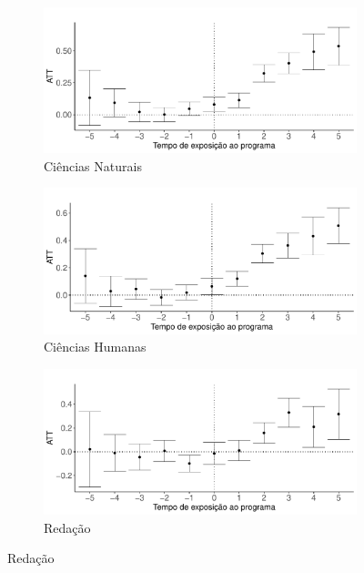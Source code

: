 \begin{figure}[H]
\begin{subfigure}{.5\textwidth}
  \centering
  \includegraphics[width=1\linewidth]{Charts/did_agg_ciencias.pdf}  
  \caption{Ciências Naturais}
  \label{fig:efeito_ciencias}
\end{subfigure}
\begin{subfigure}{.5\textwidth}
  \centering
  \includegraphics[width=1\linewidth]{Charts/did_agg_humanas.pdf}  
  \caption{Ciências Humanas}
  \label{fig:efeito_humanas}
\end{subfigure}
\begin{subfigure}{.5\textwidth}
  \centering
  \includegraphics[width=1\linewidth]{Charts/did_agg_redacao.pdf}  
  \caption{Redação}

\end{subfigure}
\end{figure}
